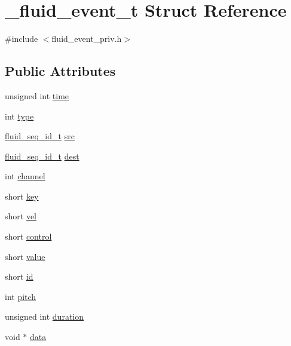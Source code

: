 \hypertarget{struct__fluid__event__t}{}\section{\+\_\+fluid\+\_\+event\+\_\+t Struct Reference}
\label{struct__fluid__event__t}


{\ttfamily \#include $<$fluid\+\_\+event\+\_\+priv.\+h$>$}

\subsection*{Public Attributes}
\begin{DoxyCompactItemize}
\item 
unsigned int \hyperlink{struct__fluid__event__t_a45920edfa4d1f9149c566faa912a77a4}{time}
\item 
int \hyperlink{struct__fluid__event__t_a06b95738f066bb75001b00ddb19d43c6}{type}
\item 
\hyperlink{types_8h_a69f729a00307f2b8ec1be0dba2203c12}{fluid\+\_\+seq\+\_\+id\+\_\+t} \hyperlink{struct__fluid__event__t_a75b29007f2bfda545fc65efe683e8ac5}{src}
\item 
\hyperlink{types_8h_a69f729a00307f2b8ec1be0dba2203c12}{fluid\+\_\+seq\+\_\+id\+\_\+t} \hyperlink{struct__fluid__event__t_a394de3be830b00267bd179d8fa90eb9f}{dest}
\item 
int \hyperlink{struct__fluid__event__t_a40f3cd242e0174458da8c0880f3b8af9}{channel}
\item 
short \hyperlink{struct__fluid__event__t_a51af3adfd857d275af8d0cf0f16ae5ce}{key}
\item 
short \hyperlink{struct__fluid__event__t_a2b1efb122c6713aef14e2c740d1a4ade}{vel}
\item 
short \hyperlink{struct__fluid__event__t_a5033de93c7c52f846d5e747e733e41c4}{control}
\item 
short \hyperlink{struct__fluid__event__t_a87bb2deb8b2438841414f3d9514c2e18}{value}
\item 
short \hyperlink{struct__fluid__event__t_a765f10da6d3adb0ed09c71e3419aee3b}{id}
\item 
int \hyperlink{struct__fluid__event__t_aa0c4ab70330e83d363a297d482584120}{pitch}
\item 
unsigned int \hyperlink{struct__fluid__event__t_a5cbade2891f0aa59e7c4d1cac7543692}{duration}
\item 
void $\ast$ \hyperlink{struct__fluid__event__t_ae793db8342106cfae35688a03abd3e4e}{data}
\end{DoxyCompactItemize}


